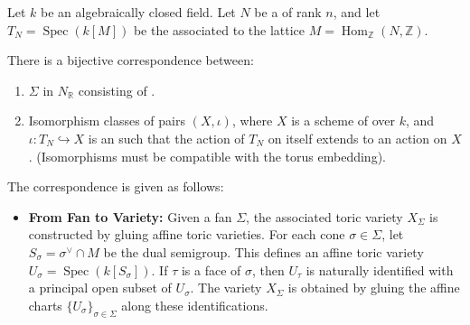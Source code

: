\begin{theorem} \label{theorem:fans_of_a_real_fin_dim_vector_space_correspond_to_normal_separated_toric_varieties_over_an_algebraicaly_closed_field}

Let $k$ be an algebraically closed field. Let $N$ be a  of rank $n$, and let $T_N = \operatorname{Spec}(k[M])$ be the  associated to the  lattice $M = \operatorname{Hom}_{\mathbb{Z}}(N, \mathbb{Z})$.


There is a bijective correspondence between:
\begin{enumerate}
\item {} $\Sigma$ in $N_{\mathbb{R}}$ consisting of  .
\item Isomorphism classes of pairs $(X, \iota)$, where $X$ is a   scheme of  over $k$, and $\iota: T_N \hookrightarrow X$ is an  such that the action of $T_N$ on itself extends to an action on $X$. (Isomorphisms must be compatible with the torus embedding).
\end{enumerate}

\noindent The correspondence is given as follows:
\begin{itemize}
    \item \textbf{From Fan to Variety:} Given a fan $\Sigma$, the associated toric variety $X_\Sigma$ is constructed by gluing affine toric varieties. For each cone $\sigma \in \Sigma$, let $S_\sigma = \sigma^\vee \cap M$ be the dual semigroup. This defines an affine toric variety $U_\sigma = \operatorname{Spec}(k[S_\sigma])$. If $\tau$ is a face of $\sigma$, then $U_\tau$ is naturally identified with a principal open subset of $U_\sigma$. The variety $X_\Sigma$ is obtained by gluing the affine charts $\{U_\sigma\}_{\sigma \in \Sigma}$ along these identifications.
    

\end{itemize}
\end{theorem}
